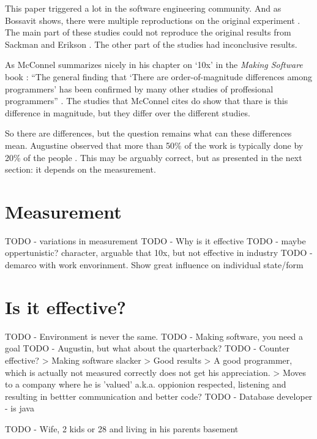 This paper triggered a lot in the software engineering community.
And as Bossavit shows, there were multiple reproductions on the original experiment \autocite[38,41]{bossavit2013leprechauns}.
The main part of these studies could not reproduce the original results from Sackman and Erikson \autocite[42-44]{bossavit2013leprechauns}.
The other part of the studies had inconclusive results.

As McConnel summarizes nicely in his chapter on `10x' in the \textit{Making Software} book \autocite{MAKING_SOFTWARE}:
``The general finding that `There are order-of-magnitude differences among programmers' has been confirmed by many other studies of proffesional programmers'' \autocite[568]{MAKING_SOFTWARE}.
The studies that McConnel cites do show that thare is this difference in magnitude, but they differ over the different studies.

So there are differences, but the question remains what can these differences mean.
Augustine observed that more than 50\% of the work is typically done by 20\% of the people \autocite{augustine}\autocite[268]{demarco1985programmer}.
This may be arguably correct, but as presented in the next section: it depends on the measurement.

\section*{Measurement}


TODO - variations in measurement
TODO - Why is it effective
TODO - maybe oppertunistic? character, arguable that 10x, but not effective in industry
TODO - demarco with work envorinment. Show great influence on individual state/form

\section*{Is it effective?}

TODO - Environment is never the same.
TODO - Making software, you need a goal
TODO - Augustin, but what about the quarterback?
TODO - Counter effective?
   > Making software slacker
   > Good results
   > A good programmer, which is actually not measured correctly does not get his appreciation.
   > Moves to a company where he is 'valued' a.k.a. oppionion respected, listening and resulting in bettter communication and better code?
TODO - Database developer - is java

TODO - Wife, 2 kids or 28 and living in his parents basement

